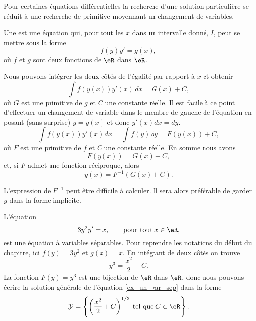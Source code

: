 Pour certaines équations différentielles la recherche d'une solution particulière se réduit à une recherche de primitive moyennant un changement de variables.
\begin{definition}
	Une   est une équation qui, pour tout les \(x\) dans un intervalle donné, \(I\), peut se mettre sous la forme
	\begin{equation}\label{eq_var_sep}
		f(y)y' = g(x),
	\end{equation}
	o\`u \(f\) et \(g\) sont deux fonctions de \(\eR\) dans \(\eR\).
\end{definition}
Nous pouvons intégrer les deux côtés de l'égalité par rapport à \(x\) et obtenir
\[
	\int f(y(x))y'(x)\, dx = G(x)+C,
\]
o\`u \( G\) est une primitive de \( g\) et \( C\) une constante réelle. Il est facile \`a ce point d'effectuer un changement de variable dans le membre de gauche de l'équation en posant (sans surprise) \(y= y(x)\) et donc \(y'(x)\,dx = dy\).
\[
	\int f(y(x))y'(x)\, dx =  \int f(y)\, dy  = F(y(x)) + C ,
\]
o\`u \( F\) est une primitive de \( f\) et \( C\) une constante réelle. En somme nous avons
\[
	F(y(x)) = G(x) + C ,
\]
et, si \( F\) admet une fonction réciproque, alors
\begin{equation}
	y(x) = F^{-1} (G(x)+C).
\end{equation}
\begin{remark}
	L'expression de \( F^{-1} \) peut être difficile à calculer. Il sera alors préférable de garder \( y\) dans la forme implicite.
\end{remark}

\begin{example}
	L'équation
	\begin{equation}\label{ex_un_var_sep}
		3y^2 y' = x, \qquad\text{pour tout } x\in\eR,
	\end{equation}
	est une équation à variables séparables. Pour reprendre les notations du début du chapitre, ici \(f(y) = 3y^2\) et \(g(x) = x\). En intégrant de deux côtés on trouve
	\[
		y^3 = \frac{x^2}{2} + C .
	\]
	La fonction \( F(y) = y^3\) est une bijection de \( \eR\) dans \( \eR\), donc nous pouvons écrire la solution générale de l'équation \eqref{ex_un_var_sep} dans la forme
	\[
		\mathcal{Y} =\left\{ \left(\frac{x^2}{2} + C \right)^{1/3} \:\text{tel que } C\in\eR\right\}.
	\]
\end{example}

